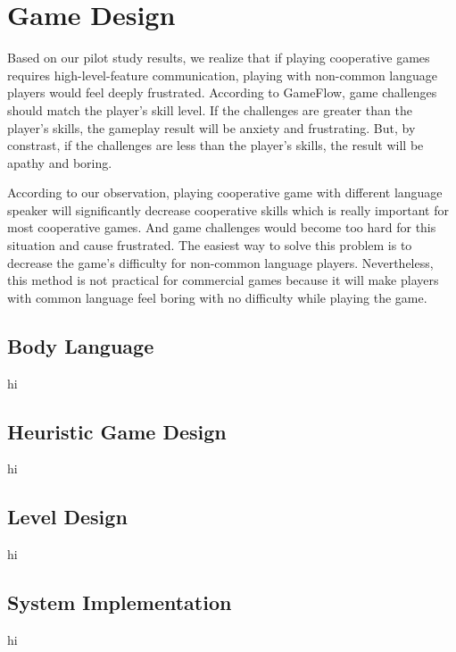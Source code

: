 \section{Game Design}


Based on our pilot study results, we realize that if playing cooperative games requires high-level-feature communication, playing with non-common language players would feel deeply frustrated. According to GameFlow\cite{GD1}, game challenges should match the player's skill level. If the challenges are greater than the player's skills, the gameplay result will be anxiety and frustrating. But, by constrast, if the challenges are less than the player's skills, the result will be apathy and boring.


According to our observation, playing cooperative game with different language speaker will significantly decrease cooperative skills which is really important for most cooperative games. And game challenges would become too hard for this situation and cause frustrated. The easiest way to solve this problem is to decrease the game's difficulty for non-common language players. Nevertheless, this method is not practical for commercial games because it will make players with common language feel boring with no difficulty while playing the game.  

\subsection{Body Language}
hi
\subsection{Heuristic Game Design}
hi
\subsection{Level Design}
hi
\subsection{System Implementation}
hi
